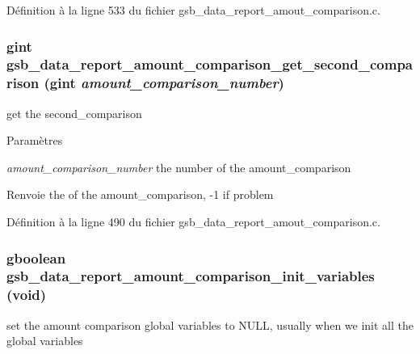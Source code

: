 Définition à la ligne 533 du fichier gsb\_\-data\_\-report\_\-amout\_\-comparison.c.

\subsubsection[{gsb\_\-data\_\-report\_\-amount\_\-comparison\_\-get\_\-second\_\-comparison}]{\setlength{\rightskip}{0pt plus 5cm}gint gsb\_\-data\_\-report\_\-amount\_\-comparison\_\-get\_\-second\_\-comparison (gint {\em amount\_\-comparison\_\-number})}\label{gsb__data__report__amout__comparison_8c_aa9d04fc293edeacf0930121bd663f234}
get the second\_\-comparison


\begin{DoxyParams}{Paramètres}
\item[{\em amount\_\-comparison\_\-number}]the number of the amount\_\-comparison\end{DoxyParams}
\begin{DoxyReturn}{Renvoie}
the of the amount\_\-comparison, -\/1 if problem 
\end{DoxyReturn}


Définition à la ligne 490 du fichier gsb\_\-data\_\-report\_\-amout\_\-comparison.c.

\subsubsection[{gsb\_\-data\_\-report\_\-amount\_\-comparison\_\-init\_\-variables}]{\setlength{\rightskip}{0pt plus 5cm}gboolean gsb\_\-data\_\-report\_\-amount\_\-comparison\_\-init\_\-variables (void)}\label{gsb__data__report__amout__comparison_8c_a4bc827b0163170e6bab3d4ea451fd10a}
set the amount comparison global variables to NULL, usually when we init all the global variables


